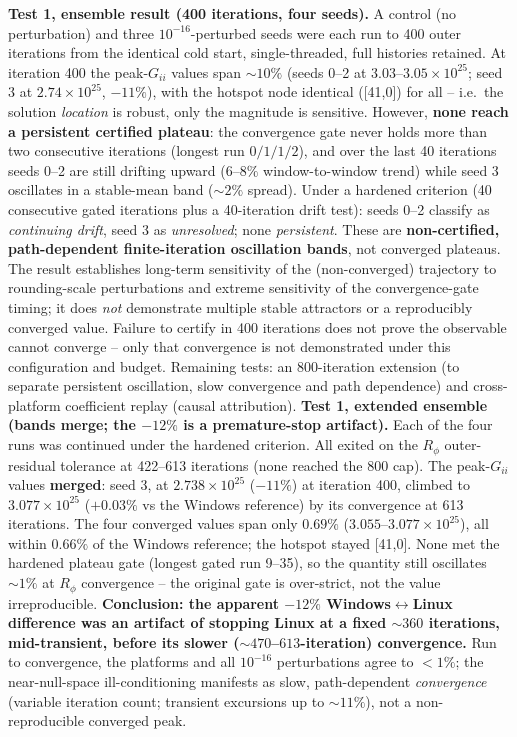 \documentclass[11pt]{article}
\newcommand{\ten}[1]{\times 10^{#1}}
\begin{document}
\textbf{Test 1, ensemble result (400 iterations, four seeds).} A control (no perturbation) and three $10^{-16}$-perturbed seeds were each run to 400 outer iterations from the identical cold start, single-threaded, full histories retained. At iteration 400 the peak-$G_{ii}$ values span $\sim10\%$ (seeds 0--2 at $3.03$--$3.05\ten{25}$; seed 3 at $2.74\ten{25}$, $-11\%$), with the hotspot node identical ([41,0]) for all -- i.e.\ the solution \emph{location} is robust, only the magnitude is sensitive. However, \textbf{none reach a persistent certified plateau}: the convergence gate never holds more than two consecutive iterations (longest run $0/1/1/2$), and over the last 40 iterations seeds 0--2 are still drifting upward ($6$--$8\%$ window-to-window trend) while seed 3 oscillates in a stable-mean band ($\sim2\%$ spread). Under a hardened criterion (40 consecutive gated iterations plus a 40-iteration drift test): seeds 0--2 classify as \emph{continuing drift}, seed 3 as \emph{unresolved}; none \emph{persistent}. These are \textbf{non-certified, path-dependent finite-iteration oscillation bands}, not converged plateaus. The result establishes long-term sensitivity of the (non-converged) trajectory to rounding-scale perturbations and extreme sensitivity of the convergence-gate timing; it does \emph{not} demonstrate multiple stable attractors or a reproducibly converged value. Failure to certify in 400 iterations does not prove the observable cannot converge -- only that convergence is not demonstrated under this configuration and budget. Remaining tests: an 800-iteration extension (to separate persistent oscillation, slow convergence and path dependence) and cross-platform coefficient replay (causal attribution). \textbf{Test 1, extended ensemble (bands merge; the $-12\%$ is a premature-stop artifact).} Each of the four runs was continued under the hardened criterion. All exited on the $R_\phi$ outer-residual tolerance at 422--613 iterations (none reached the 800 cap). The peak-$G_{ii}$ values \textbf{merged}: seed 3, at $2.738\ten{25}$ ($-11\%$) at iteration 400, climbed to $3.077\ten{25}$ ($+0.03\%$ vs the Windows reference) by its convergence at 613 iterations. The four converged values span only $0.69\%$ ($3.055$--$3.077\ten{25}$), all within $0.66\%$ of the Windows reference; the hotspot stayed [41,0]. None met the hardened plateau gate (longest gated run 9--35), so the quantity still oscillates $\sim1\%$ at $R_\phi$ convergence -- the original gate is over-strict, not the value irreproducible. \textbf{Conclusion: the apparent $-12\%$ Windows$\leftrightarrow$Linux difference was an artifact of stopping Linux at a fixed $\sim360$ iterations, mid-transient, before its slower ($\sim470$--$613$-iteration) convergence.} Run to convergence, the platforms and all $10^{-16}$ perturbations agree to $<1\%$; the near-null-space ill-conditioning manifests as slow, path-dependent \emph{convergence} (variable iteration count; transient excursions up to $\sim11\%$), not a non-reproducible converged peak.
\end{document}
